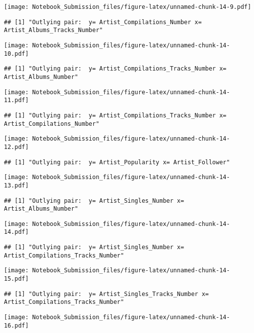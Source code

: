 \documentclass[
]{article}
\begin{document}
\texttt{[image: Notebook\_Submission\_files/figure-latex/unnamed-chunk-14-9.pdf]}

\begin{verbatim}
## [1] "Outlying pair:  y= Artist_Compilations_Number x= Artist_Albums_Tracks_Number"
\end{verbatim}

\texttt{[image: Notebook\_Submission\_files/figure-latex/unnamed-chunk-14-10.pdf]}

\begin{verbatim}
## [1] "Outlying pair:  y= Artist_Compilations_Tracks_Number x= Artist_Albums_Number"
\end{verbatim}

\texttt{[image: Notebook\_Submission\_files/figure-latex/unnamed-chunk-14-11.pdf]}

\begin{verbatim}
## [1] "Outlying pair:  y= Artist_Compilations_Tracks_Number x= Artist_Compilations_Number"
\end{verbatim}

\texttt{[image: Notebook\_Submission\_files/figure-latex/unnamed-chunk-14-12.pdf]}

\begin{verbatim}
## [1] "Outlying pair:  y= Artist_Popularity x= Artist_Follower"
\end{verbatim}

\texttt{[image: Notebook\_Submission\_files/figure-latex/unnamed-chunk-14-13.pdf]}

\begin{verbatim}
## [1] "Outlying pair:  y= Artist_Singles_Number x= Artist_Albums_Number"
\end{verbatim}

\texttt{[image: Notebook\_Submission\_files/figure-latex/unnamed-chunk-14-14.pdf]}

\begin{verbatim}
## [1] "Outlying pair:  y= Artist_Singles_Number x= Artist_Compilations_Tracks_Number"
\end{verbatim}

\texttt{[image: Notebook\_Submission\_files/figure-latex/unnamed-chunk-14-15.pdf]}

\begin{verbatim}
## [1] "Outlying pair:  y= Artist_Singles_Tracks_Number x= Artist_Compilations_Tracks_Number"
\end{verbatim}

\texttt{[image: Notebook\_Submission\_files/figure-latex/unnamed-chunk-14-16.pdf]}
\end{document}
